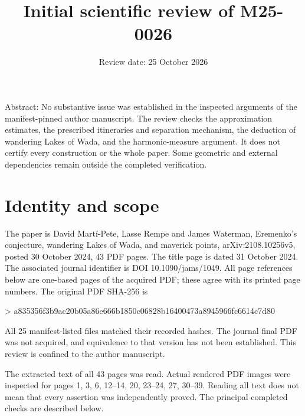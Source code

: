 \documentclass[10pt]{article}
\title{Initial scientific review of M25-0026}
\author{}
\date{Review date: 25 October 2026}
\begin{document}
\maketitle
Abstract: No substantive issue was established in the inspected arguments of the manifest-pinned author manuscript. The review checks the approximation estimates, the prescribed itineraries and separation mechanism, the deduction of wandering Lakes of Wada, and the harmonic-measure argument. It does not certify every construction or the whole paper. Some geometric and external dependencies remain outside the completed verification.\par
\section*{Identity and scope}
The paper is David Martí-Pete, Lasse Rempe and James Waterman, Eremenko’s conjecture, wandering Lakes of Wada, and maverick points, arXiv:2108.10256v5, posted 30 October 2024, 43 PDF pages. The title page is dated 31 October 2024. The associated journal identifier is DOI 10.1090/jams/1049. All page references below are one-based pages of the acquired PDF; these agree with its printed page numbers. The original PDF SHA-256 is\par
> a835356f3b9ac20b05a86e666b1850c06828b16400473a8945966fc6614c7d80\par
All 25 manifest-listed files matched their recorded hashes. The journal final PDF was not acquired, and equivalence to that version has not been established. This review is confined to the author manuscript.\par
The extracted text of all 43 pages was read. Actual rendered PDF images were inspected for pages 1, 3, 6, 12–14, 20, 23–24, 27, 30–39. Reading all text does not mean that every assertion was independently proved. The principal completed checks are described below.\par
\end{document}
